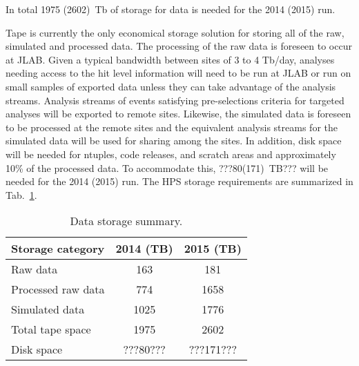 In total 1975 (2602)~Tb of storage for data is needed for the 2014 (2015) run.

Tape is currently the only economical storage
solution for storing all of the raw, simulated and processed data.
The processing of the raw data is foreseen to occur at JLAB. Given a
typical bandwidth between sites of 3 to 4 Tb/day, analyses needing
access to the hit level information will need to be run at JLAB or run
on small samples of exported data unless they can take advantage of the
analysis streams. Analysis streams of events satisfying
pre-selections criteria for targeted analyses will be exported to remote
sites. Likewise, the simulated data is foreseen to be processed at the
remote sites and the equivalent analysis streams for the simulated data
will be used for sharing among the sites. In addition, disk space will be 
needed for ntuples, code releases, and scratch areas and approximately 10\% of the 
processed data. To accommodate this, ???80(171)~TB??? will be needed for the 2014 (2015) run. 
The HPS storage requirements are summarized in Tab.~\ref{tab:datastorage}.
\begin{table}[tbp]
\centering
\begin{tabular}{|l|c|c|}
\hline
Storage category & 2014 (TB) & 2015 (TB) \\
\hline
Raw data & 163 & 181 \\
Processed raw data & 774 & 1658 \\
Simulated data & 1025 & 1776 \\
\hline
Total tape space & 1975 & 2602 \\
\hline
Disk space  & ???80???  & ???171??? \\
\hline
\end{tabular}
\caption{{\small Data storage summary.}}
\label{tab:datastorage}
\end{table}


